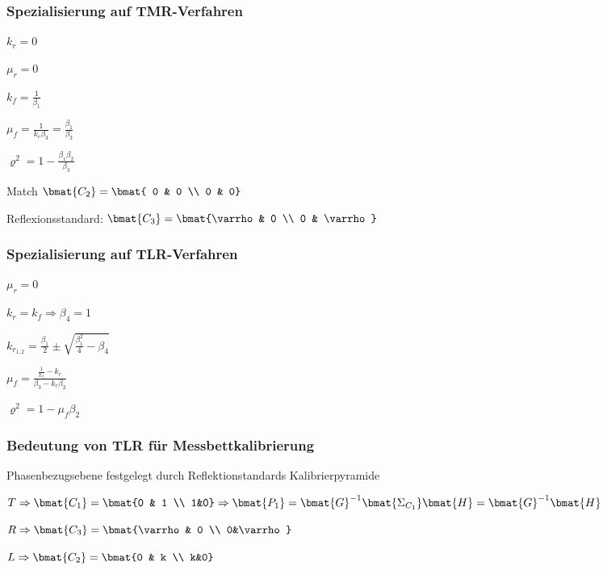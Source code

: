 \subsubsection{Spezialisierung auf TMR-Verfahren}
\begin{pitemize}
    \item $k_r = 0$
    \item $\mu_r = 0$
    \item $k_f = \frac{1}{\beta_1}$
    \item $\mu_f = \frac{1}{k_r \beta_3} = \frac{\beta_1}{\beta_3}$
    \item $\varrho^2 = 1 - \frac{\beta_1 \beta_2}{\beta_3}$
\end{pitemize}

\begin{pitemize}
    \item Match $\bmat{C_2} = \bmat{ 0 & 0 \\ 0 & 0}$
    \item Reflexionsstandard: $\bmat{C_3} =\bmat{\varrho & 0 \\ 0 & \varrho}$
\end{pitemize}

\subsubsection{Spezialisierung auf TLR-Verfahren}
\begin{pitemize}
    \item $\mu_r = 0$
    \item $k_r = k_f \Rightarrow \beta_4 = 1$
    \item $k_{r_{1,2}} = \frac{\beta_1}{2} \pm \sqrt{\frac{\beta_1^2}{4} - \beta_4}$
    \item $\mu_f = \frac{\frac{1}{k_f} - k_r}{\beta_3 - k_r \beta_2}$
    \item$\varrho^2 = 1 - \mu_f \beta_2$
\end{pitemize}


\subsubsection{Bedeutung von TLR für Messbettkalibrierung}


Phasenbezugsebene festgelegt durch Reflektionstandards
Kalibrierpyramide


\begin{pitemize}
    \item $T \Rightarrow \bmat{C_1} = \bmat{0 & 1 \\ 1&0} \Rightarrow \bmat{P_1} = \bmat{G}^{-1}\bmat{\Sigma_{C_1}}\bmat{H} = \bmat{G}^{-1} \bmat{H}$ 
    \item $R \Rightarrow \bmat{C_3} = \bmat{\varrho & 0 \\ 0&\varrho}$
    \item $L \Rightarrow \bmat{C_2} = \bmat{0 & k \\ k&0}$
\end{pitemize}


